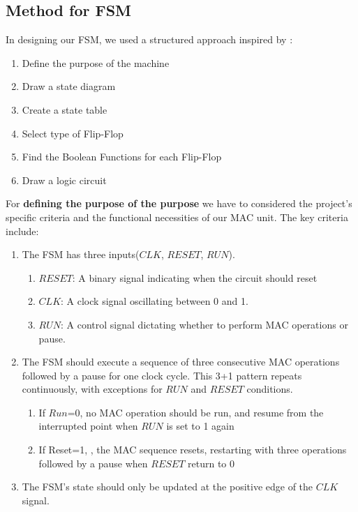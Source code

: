\subsection{Method for FSM}
In designing our FSM, we used a structured approach inspired by  \cite{allaboutelectronics_2023_sequence}:
\begin{enumerate}
    \item Define the purpose of the machine
    \item Draw a state diagram
    \item Create a state table
    \item Select type of Flip-Flop
    \item Find the Boolean Functions for each Flip-Flop
    \item Draw a logic circuit
\end{enumerate}
For \textbf{defining the purpose of the purpose} we have to considered the project's specific criteria and the functional necessities of our MAC unit. The key criteria include:
\begin{enumerate}
    \item The FSM has three inputs($CLK$, $RESET$, $RUN$).
    \begin{enumerate}
        \item $RESET$: A binary signal indicating when the circuit should reset
        \item $CLK$: A clock signal oscillating between 0 and 1.
        \item $RUN$: A control signal dictating whether to perform MAC operations or pause.
    \end{enumerate}
    \item The FSM should execute a sequence of three consecutive MAC operations followed by a pause for one clock cycle. This 3+1 pattern repeats continuously, with exceptions for $RUN$ and $RESET$ conditions.
    \begin{enumerate}
        \item If $Run$=0, no MAC operation should be run, and resume from the interrupted point when 
        $RUN$ is set to 1 again
        \item If Reset=1, , the MAC sequence resets, restarting with three operations followed by a pause when $RESET$ return to 0
    \end{enumerate}
    \item The FSM’s state should only be updated at the positive edge of the $CLK$ signal.
\end{enumerate}

